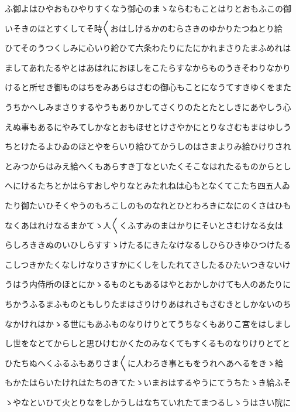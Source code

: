 \documentclass[a4paper,11pt,landscape]{ltjtarticle}
\begin{document}
\par\medskip
ふ御よはひやおもひやりすくなう御心のまゝならむもことはりとおもふこの御
\par\medskip
いそきのほとすくしてそ時〱おはしけるかのむらさきのゆかりたつねとり給
\par\medskip
ひてそのうつくしみに心いり給ひて六条わたりにたにかれまさりたまふめれは
\par\medskip
ましてあれたるやとはあはれにおほしをこたらすなからものうきそわりなかり
\par\medskip
けると所せき御ものはちをみあらはさむの御心もことになうてすきゆくをまた
\par\medskip
うちかへしみまさりするやうもありかしてさくりのたとたとしきにあやしう心
\par\medskip
えぬ事もあるにやみてしかなとおもほせとけさやかにとりなさむもまはゆしう
\par\medskip
ちとけたるよひゐのほとやをらいり給ひてかうしのはさまよりみ給ひけりされ
\par\medskip
とみつからはみえ給へくもあらすき丁なといたくそこなはれたるものからとし
\par\medskip
へにけるたちとかはらすおしやりなとみたれねは心もとなくてこたち四五人ゐ
\par\medskip
たり御たいひそくやうのもろこしのものなれとひとわろきになにのくさはひも
\par\medskip
なくあはれけなるまかてゝ人〱くふすみのまはかりにそいとさむけなる女は
\par\medskip
らしろききぬのいひしらすすゝけたるにきたなけなるしひらひきゆひつけたる
\par\medskip
こしつきかたくなしけなりさすかにくしをしたれてさしたるひたいつきないけ
\par\medskip
うはう内侍所のほとにかゝるものともあるはやとおかしかけても人のあたりに
\par\medskip
ちかうふるまふものともしりたまはさりけりあはれさもさむきとしかないのち
\par\medskip
なかけれはかゝる世にもあふものなりけりとてうちなくもありこ宮をはしまし
\par\medskip
し世をなとてからしと思ひけむかくたのみなくてもすくるものなりけりとてと
\par\medskip
ひたちぬへくふるふもありさま〱に人わろき事ともをうれへあへるをきゝ給
\par\medskip
もかたはらいたけれはたちのきてたゝいまおはするやうにてうちたゝき給ふそ
\par\medskip
ゝやなといひて火とりなをしかうしはなちていれたてまつるしゝうはさい院に
\par\medskip
\end{document}
